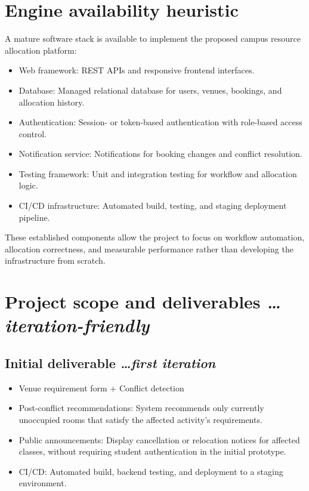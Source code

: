 \documentclass[11pt,a4paper]{article}
\newcommand{\BvrHint}[1]{%
  {\normalfont\normalsize\itshape\hfill #1}}
\begin{document}
\section{Engine availability heuristic}
A mature software stack is available to implement the proposed campus resource allocation platform:
\begin{itemize}[leftmargin=0.7cm]
    \item Web framework: REST APIs and responsive frontend interfaces.
    \item Database: Managed relational database for users, venues, bookings, and allocation history.
    \item Authentication: Session- or token-based authentication with role-based access control.
    \item Notification service: Notifications for booking changes and conflict resolution.
    \item Testing framework: Unit and integration testing for workflow and allocation logic.
    \item CI/CD infrastructure: Automated build, testing, and staging deployment pipeline.
\end{itemize}
These established components allow the project to focus on workflow automation, allocation correctness, and measurable performance rather than developing the infrastructure from scratch.

\section{Project scope and deliverables %
\BvrHint{\ldots iteration-friendly}}
\subsection{Initial deliverable %
\BvrHint{\ldots first iteration}}
\begin{itemize}[leftmargin=0.7cm]
    \item Venue requirement form + Conflict detection
    \item Post-conflict recommendations: System recommends only currently unoccupied rooms that satisfy the affected activity's requirements.
    \item Public announcements: Display cancellation or relocation notices for affected classes, without requiring student authentication in the initial prototype.
    \item CI/CD: Automated build, backend testing, and deployment to a staging environment.
\end{itemize}
\end{document}
